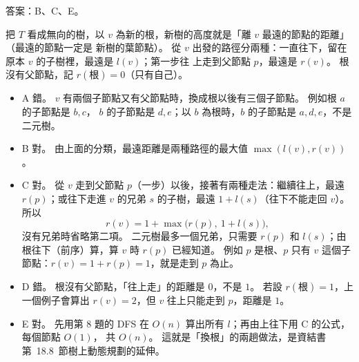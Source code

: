\begin{pastsoln}
答案：B、C、E。

把 $T$ 看成無向的樹，以 $v$ 為新的根，新樹的高度就是「離 $v$ 最遠的節點的距離」（最遠的節點一定是
新樹的葉節點）。 從 $v$ 出發的路徑分兩種：一直往下，留在原本 $v$ 的子樹裡，最遠是 $l(v)$；第一步往
上走到父節點 $p$，最遠是 $r(v)$。 根沒有父節點，記 $r(\text{根}) = 0$（只有自己）。
\begin{itemize}
\item A 錯。 $v$ 有兩個子節點又有父節點時，換成根以後有三個子節點。 例如根 $a$ 的子節點是 $b, c$，
$b$ 的子節點是 $d, e$；以 $b$ 為根時，$b$ 的子節點是 $a, d, e$，不是二元樹。
\item B 對。 由上面的分類，最遠距離是兩種路徑的最大值 $\max(l(v), r(v))$。
\item C 對。 從 $v$ 走到父節點 $p$（一步）以後，接著有兩種走法：繼續往上，最遠 $r(p)$；或往下走進
$v$ 的兄弟 $s$ 的子樹，最遠 $1 + l(s)$（往下不能走回 $v$）。 所以
\[
r(v) = 1 + \max\bigl(r(p),\ 1 + l(s)\bigr),
\]
沒有兄弟時省略第二項。 二元樹最多一個兄弟，只需要 $r(p)$ 和 $l(s)$；由根往下（前序）算，算 $v$ 時
$r(p)$ 已經知道。 例如 $p$ 是根、$p$ 只有 $v$ 這個子節點：$r(v) = 1 + r(p) = 1$，就是走到 $p$ 為止。
\item D 錯。 根沒有父節點，「往上走」的距離是 $0$，不是 $1$。 若設 $r(\text{根}) = 1$，上一個例子會算出
$r(v) = 2$，但 $v$ 往上只能走到 $p$，距離是 $1$。
\item E 對。 先用第 8 題的 DFS 在 $O(n)$ 算出所有 $l$；再由上往下用 C 的公式，每個節點 $O(1)$，
共 $O(n)$。 這就是「換根」的兩趟做法，是資結書第~18.8~節樹上動態規劃的延伸。
\end{itemize}
\end{pastsoln}
